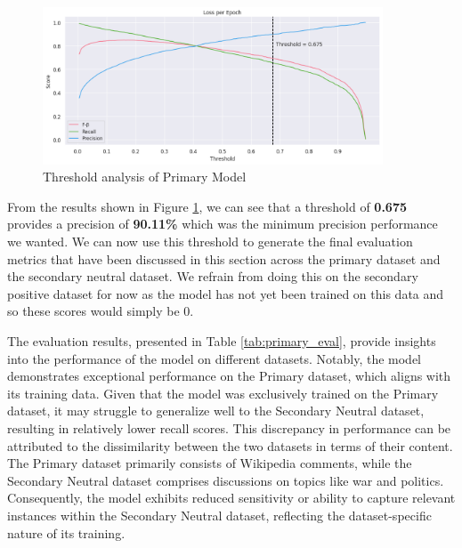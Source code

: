 \begin{figure}[H]
    \centering
    \includegraphics[width=0.9\textwidth]{graphs/training/primary_threshold.png}
    \caption{Threshold analysis of Primary Model}
    \label{fig:primary_threshold}
\end{figure}

From the results shown in Figure \ref{fig:primary_threshold}, we can see that a threshold of \textbf{0.675} provides a precision of \textbf{90.11\%} which was the minimum precision performance we wanted. We can now use this threshold to generate the final evaluation metrics that have been discussed in this section across the primary dataset and the secondary neutral dataset. We refrain from doing this on the secondary positive dataset for now as the model has not yet been trained on this data and so these scores would simply be 0.

\begin{table}[ht]
    \vspace{5pt}
    \caption{F-beta scores for different ratios}
    \label{tab:primary_eval}
\end{table}

The evaluation results, presented in Table \ref{tab:primary_eval}, provide insights into the performance of the model on different datasets. Notably, the model demonstrates exceptional performance on the Primary dataset, which aligns with its training data. Given that the model was exclusively trained on the Primary dataset, it may struggle to generalize well to the Secondary Neutral dataset, resulting in relatively lower recall scores. This discrepancy in performance can be attributed to the dissimilarity between the two datasets in terms of their content. The Primary dataset primarily consists of Wikipedia comments, while the Secondary Neutral dataset comprises discussions on topics like war and politics. Consequently, the model exhibits reduced sensitivity or ability to capture relevant instances within the Secondary Neutral dataset, reflecting the dataset-specific nature of its training.

